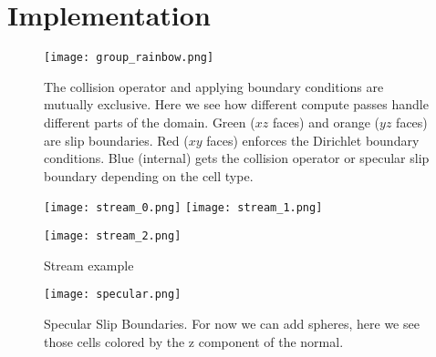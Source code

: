 \section{Implementation}

\begin{figure}
  \begin{center}
    \texttt{[image: group\_rainbow.png]}
  \end{center}
  \caption{The collision operator and applying boundary conditions are mutually exclusive.
  Here we see how different compute passes handle different parts of the domain.
Green ($xz$ faces) and orange ($yz$ faces) are slip boundaries.
Red ($xy$ faces) enforces the Dirichlet boundary conditions.
Blue (internal) gets the collision operator or specular slip boundary 
depending on the cell type.}
\end{figure}

\begin{figure}
  \begin{center}
    \texttt{[image: stream\_0.png]}
    \texttt{[image: stream\_1.png]}

    \texttt{[image: stream\_2.png]}
  \end{center}
  \caption{Stream example}
\end{figure}

\begin{figure}
  \begin{center}
    \texttt{[image: specular.png]}
  \end{center}
  \caption{Specular Slip Boundaries.
For now we can add spheres, here we see those cells colored by the z component of the normal.}
\end{figure}
